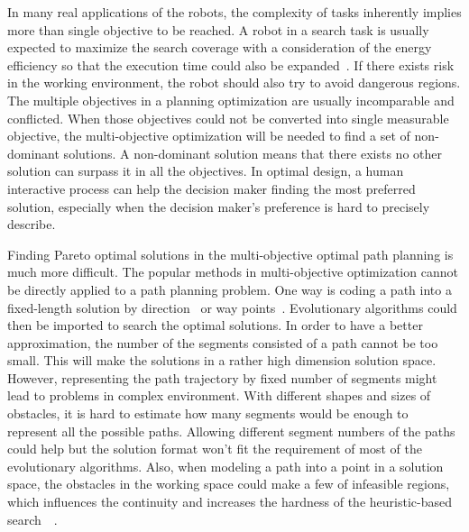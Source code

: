 \documentclass[conference]{IEEEtran}
\theoremstyle{definition}
\begin{document}

In many real applications of the robots, the complexity of tasks inherently implies more than single objective to be reached.
A robot in a search task is usually expected to maximize the search coverage with a consideration of the energy efficiency so that the execution time could also be expanded~\cite{yi2014supporting}. 
If there exists risk in the working environment, the robot should also try to avoid dangerous regions.
The multiple objectives in a planning optimization are usually incomparable and conflicted.
When those objectives could not be converted into single measurable objective, the multi-objective optimization will be needed to find a set of non-dominant solutions.
A non-dominant solution means that there exists no other solution can surpass it in all the objectives.
In optimal design, a human interactive process can help the decision maker finding the most preferred solution, especially when the decision maker's preference is hard to precisely describe.

Finding Pareto optimal solutions in the multi-objective optimal path planning is much more difficult.
The popular methods in multi-objective optimization cannot be directly applied to a path planning problem.
One way is coding a path into a fixed-length solution by direction~\cite{Ahmed2013} or way points~\cite{5160222}.
Evolutionary algorithms could then be imported to search the optimal solutions.
In order to have a better approximation, the number of the segments consisted of a path cannot be too small.
This will make the solutions in a rather high dimension solution space.
However, representing the path trajectory by fixed number of segments might lead to problems in complex environment.
With different shapes and sizes of obstacles, it is hard to estimate how many segments would be enough to represent all the possible paths.
Allowing different segment numbers of the paths could help but the solution format won't fit the requirement of most of the evolutionary algorithms.
Also, when modeling a path into a point in a solution space, the obstacles in the working space could make a few of infeasible regions, which influences the continuity and increases the hardness of the heuristic-based search~\cite{5160222}~\cite{4358754}.
\end{document}
